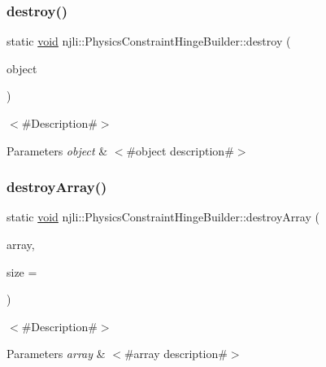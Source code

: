 \subsubsection{\texorpdfstring{destroy()}{destroy()}}
{\footnotesize\ttfamily static \mbox{\hyperlink{_thread_8h_af1e856da2e658414cb2456cb6f7ebc66}{void}} njli\+::\+Physics\+Constraint\+Hinge\+Builder\+::destroy (\begin{DoxyParamCaption}\item[{\mbox{\hyperlink{classnjli_1_1_physics_constraint_hinge_builder}{Physics\+Constraint\+Hinge\+Builder}} $\ast$}]{object }\end{DoxyParamCaption})\hspace{0.3cm}{\ttfamily [static]}}

$<$\#\+Description\#$>$


\begin{DoxyParams}{Parameters}
{\em object} & $<$\#object description\#$>$ \\
\hline
\end{DoxyParams}
\mbox{\label{classnjli_1_1_physics_constraint_hinge_builder_a9f7bb6bccee74609eba62cf0067927f0}} 
\subsubsection{\texorpdfstring{destroy\+Array()}{destroyArray()}}
{\footnotesize\ttfamily static \mbox{\hyperlink{_thread_8h_af1e856da2e658414cb2456cb6f7ebc66}{void}} njli\+::\+Physics\+Constraint\+Hinge\+Builder\+::destroy\+Array (\begin{DoxyParamCaption}\item[{\mbox{\hyperlink{classnjli_1_1_physics_constraint_hinge_builder}{Physics\+Constraint\+Hinge\+Builder}} $\ast$$\ast$}]{array,  }\item[{const \mbox{\hyperlink{_util_8h_a10e94b422ef0c20dcdec20d31a1f5049}{u32}}}]{size = {} }\end{DoxyParamCaption})\hspace{0.3cm}{\ttfamily [static]}}

$<$\#\+Description\#$>$


\begin{DoxyParams}{Parameters}
{\em array} & $<$\#array description\#$>$ \\
\hline
\end{DoxyParams}
\mbox{\label{classnjli_1_1_physics_constraint_hinge_builder_ab5e963ca036022a3881bbd4ba6a033d5}} 
